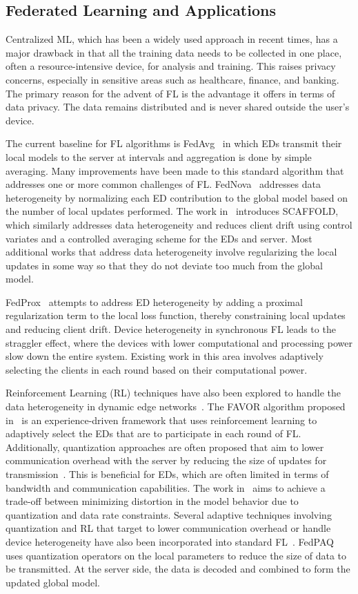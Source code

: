 \documentclass[journal]{IEEEtran}
\begin{document}
\subsection{Federated Learning and Applications}
Centralized ML, which has been a widely used approach in recent times, has a major drawback in that all the training data needs to be collected in one place, often a resource-intensive device, for analysis and training. This raises privacy concerns, especially in sensitive areas such as healthcare, finance, and banking. The primary reason for the advent of FL is the advantage it offers in terms of data privacy. The data remains distributed and is never shared outside the user's device. 

The current baseline for FL algorithms is FedAvg~\cite{fedavg-introduction} in which EDs transmit their local models to the server at intervals and aggregation is done by simple averaging. Many improvements have been made to this standard algorithm that addresses one or more common challenges of FL. FedNova~\cite{fednova} addresses data heterogeneity by normalizing each ED contribution to the global model based on the number of local updates performed. The work in~\cite{scaffold} introduces SCAFFOLD, which similarly addresses data heterogeneity and reduces client drift using control variates and a controlled averaging scheme for the EDs and server. Most additional works that address data heterogeneity involve regularizing the local updates in some way so that they do not deviate too much from the global model.

FedProx~\cite{fedprox} attempts to address ED heterogeneity by adding a proximal regularization term to the local loss function, thereby constraining local updates and reducing client drift. Device heterogeneity in synchronous FL leads to the straggler effect, where the devices with lower computational and processing power slow down the entire system. Existing work in this area involves adaptively selecting the clients in each round based on their computational power. 

Reinforcement Learning (RL) techniques have also been explored to handle the data heterogeneity in dynamic edge networks~\cite{singh2025selffed}. The FAVOR algorithm proposed in~\cite{fl-rl1} is an experience-driven framework that uses reinforcement learning to adaptively select the EDs that are to participate in each round of FL. Additionally, quantization approaches are often proposed that aim to lower communication overhead with the server by reducing the size of updates for transmission~\cite{quant}. This is beneficial for EDs, which are often limited in terms of bandwidth and communication capabilities. The work in~\cite{quantization} aims to achieve a trade-off between minimizing distortion in the model behavior due to quantization and data rate constraints. Several adaptive techniques involving quantization and RL that target to lower communication overhead or handle device heterogeneity have also been incorporated into standard FL~\cite{drl-quantization, drl-client-selection}. FedPAQ~\cite{fedpaq} uses quantization operators on the local parameters to reduce the size of data to be transmitted. At the server side, the data is decoded and combined to form the updated global model. 
\end{document}

